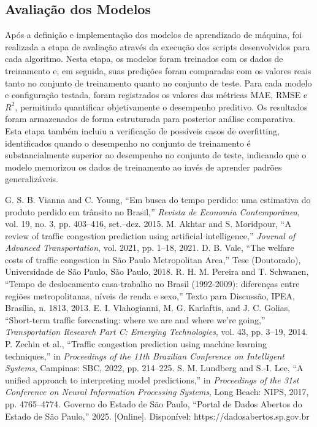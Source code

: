 \documentclass[conference]{IEEEtran}
\begin{document}
\subsection{Avaliação dos Modelos}
Após a definição e implementação dos modelos de aprendizado de máquina, foi realizada a etapa de avaliação através da execução dos scripts desenvolvidos para cada algoritmo. Nesta etapa, os modelos foram treinados com os dados de treinamento e, em seguida, suas predições foram comparadas com os valores reais tanto no conjunto de treinamento quanto no conjunto de teste. Para cada modelo e configuração testada, foram registrados os valores das métricas MAE, RMSE e $R^2$, permitindo quantificar objetivamente o desempenho preditivo. Os resultados foram armazenados de forma estruturada para posterior análise comparativa. Esta etapa também incluiu a verificação de possíveis casos de overfitting, identificados quando o desempenho no conjunto de treinamento é substancialmente superior ao desempenho no conjunto de teste, indicando que o modelo memorizou os dados de treinamento ao invés de aprender padrões generalizáveis.



\begin{thebibliography}{00}

 G. S. B. Vianna and C. Young, ``Em busca do tempo perdido: uma estimativa do produto perdido em trânsito no Brasil,'' \textit{Revista de Economia Contemporânea}, vol. 19, no. 3, pp. 403--416, set.--dez. 2015.
 M. Akhtar and S. Moridpour, ``A review of traffic congestion prediction using artificial intelligence,'' \textit{Journal of Advanced Transportation}, vol. 2021, pp. 1--18, 2021.
 D. B. Vale, ``The welfare costs of traffic congestion in São Paulo Metropolitan Area,'' Tese (Doutorado), Universidade de São Paulo, São Paulo, 2018.
 R. H. M. Pereira and T. Schwanen, ``Tempo de deslocamento casa-trabalho no Brasil (1992-2009): diferenças entre regiões metropolitanas, níveis de renda e sexo,'' Texto para Discussão, IPEA, Brasília, n. 1813, 2013.
 E. I. Vlahogianni, M. G. Karlaftis, and J. C. Golias, ``Short-term traffic forecasting: where we are and where we're going,'' \textit{Transportation Research Part C: Emerging Technologies}, vol. 43, pp. 3--19, 2014.
 P. Zechin et al., ``Traffic congestion prediction using machine learning techniques,'' in \textit{Proceedings of the 11th Brazilian Conference on Intelligent Systems}, Campinas: SBC, 2022, pp. 214--225.
 S. M. Lundberg and S.-I. Lee, ``A unified approach to interpreting model predictions,'' in \textit{Proceedings of the 31st Conference on Neural Information Processing Systems}, Long Beach: NIPS, 2017, pp. 4765--4774.
 Governo do Estado de São Paulo, ``Portal de Dados Abertos do Estado de São Paulo,'' 2025. [Online]. Disponível: https://dadosabertos.sp.gov.br

\end{thebibliography}
\end{document}
